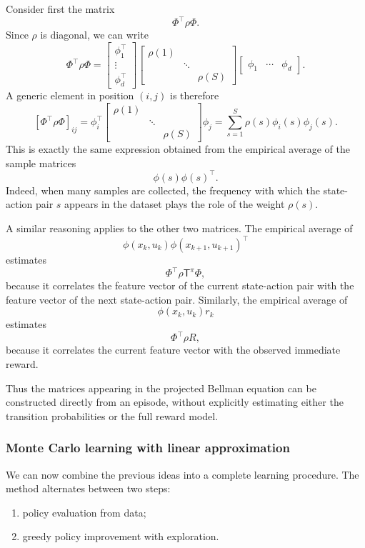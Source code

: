 Consider first the matrix
\[
\Phi^\top\rho\Phi.
\]
Since \(\rho\) is diagonal, we can write
\[
\Phi^\top\rho\Phi
=
\begin{bmatrix}
\phi_1^\top\\
\vdots\\
\phi_d^\top
\end{bmatrix}
\begin{bmatrix}
\rho(1) & & \\
& \ddots & \\
& & \rho(S)
\end{bmatrix}
\begin{bmatrix}
\phi_1 & \cdots & \phi_d
\end{bmatrix}.
\]
A generic element in position \((i,j)\) is therefore
\[
\left[\Phi^\top\rho\Phi\right]_{ij}
=
\phi_i^\top
\begin{bmatrix}
\rho(1) & & \\
& \ddots & \\
& & \rho(S)
\end{bmatrix}
\phi_j
=
\sum_{s=1}^{S}\rho(s)\phi_i(s)\phi_j(s).
\]
This is exactly the same expression obtained from the empirical average of the sample matrices
\[
\phi(s)\phi(s)^\top.
\]
Indeed, when many samples are collected, the frequency with which the state-action pair \(s\)
appears in the dataset plays the role of the weight \(\rho(s)\).

A similar reasoning applies to the other two matrices. The empirical average of
\[
\phi(x_k,u_k)\phi(x_{k+1},u_{k+1})^\top
\]
estimates
\[
\Phi^\top\rho\mathsf{T}^{\pi}\Phi,
\]
because it correlates the feature vector of the current state-action pair with the feature vector
of the next state-action pair. Similarly, the empirical average of
\[
\phi(x_k,u_k)r_k
\]
estimates
\[
\Phi^\top\rho R,
\]
because it correlates the current feature vector with the observed immediate reward.

Thus the matrices appearing in the projected Bellman equation can be constructed directly from
an episode, without explicitly estimating either the transition probabilities or the full reward
model.

\subsubsection{Monte Carlo learning with linear approximation}

We can now combine the previous ideas into a complete learning procedure. The method
alternates between two steps:
\begin{enumerate}
    \item policy evaluation from data;
    \item greedy policy improvement with exploration.
\end{enumerate}

